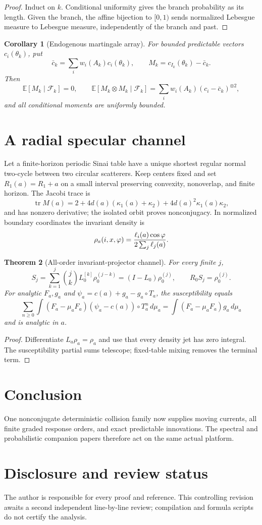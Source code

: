 \documentclass[11pt,reqno]{amsart}
\newtheorem{theorem}{Theorem}[section]
\newtheorem{corollary}[theorem]{Corollary}
\theoremstyle{definition}
\theoremstyle{remark}
\newcommand{\F}{\mathcal F}
\begin{document}
\begin{proof}
Induct on $k$.  Conditional uniformity gives the branch probability as its
length.  Given the branch, the affine bijection to $[0,1)$ sends normalized
Lebesgue measure to Lebesgue measure, independently of the branch and past.
\end{proof}

\begin{corollary}[Endogenous martingale array]\label{cor:martingale}
For bounded predictable vectors $c_i(\theta_k)$, put
\[
 \bar c_k=\sum_iw_i(A_k)c_i(\theta_k),
 \qquad M_k=c_{I_k}(\theta_k)-\bar c_k.
\]
Then
\[
 \mathbb E[M_k\mid\F_k]=0,
 \qquad
 \mathbb E[M_k\otimes M_k\mid\F_k]
 =\sum_iw_i(A_k)(c_i-\bar c_k)^{\otimes2},
\]
and all conditional moments are uniformly bounded.
\end{corollary}

\section{A radial specular channel}\label{sec:specular}
Let a finite-horizon periodic Sinai table have a unique shortest regular normal
two-cycle between two circular scatterers.  Keep centers fixed and set
$R_1(a)=R_1+a$ on a small interval preserving convexity, nonoverlap, and finite
horizon.  The Jacobi trace is
\[
 \operatorname{tr}M(a)=2+4d(a)(\kappa_1(a)+\kappa_2)
 +4d(a)^2\kappa_1(a)\kappa_2,
\]
and has nonzero derivative; the isolated orbit proves nonconjugacy.  In
normalized boundary coordinates the invariant density is
\[
 \rho_a(i,x,\varphi)={\ell_i(a)\cos\varphi\over2\sum_j\ell_j(a)}.
\]

\begin{theorem}[All-order invariant-projector channel]\label{thm:specular}
For every finite $j$,
\[
 S_j=\sum_{k=1}^j{j\choose k}L_0^{[k]}\rho_0^{(j-k)}
 =(I-L_0)\rho_0^{(j)},
 \qquad R_0S_j=\rho_0^{(j)}.
\]
For analytic $F_a,g_a$ and
$\psi_a=c(a)+g_a-g_a\circ T_a$, the susceptibility equals
\[
 \sum_{n\ge0}\int(F_a-\mu_aF_a)
 (\psi_a-c(a))\circ T_a^n\,d\mu_a
 =\int(F_a-\mu_aF_a)g_a\,d\mu_a
\]
and is analytic in $a$.
\end{theorem}

\begin{proof}
Differentiate $L_a\rho_a=\rho_a$ and use that every density jet has zero
integral.  The susceptibility partial sums telescope; fixed-table mixing
removes the terminal term.
\end{proof}

\section{Conclusion}
One nonconjugate deterministic collision family now supplies moving currents,
all finite graded response orders, and exact predictable innovations.  The
spectral and probabilistic companion papers therefore act on the same actual
platform.

\section*{Disclosure and review status}
The author is responsible for every proof and reference.  This controlling
revision awaits a second independent line-by-line review; compilation and
formula scripts do not certify the analysis.



\end{document}
